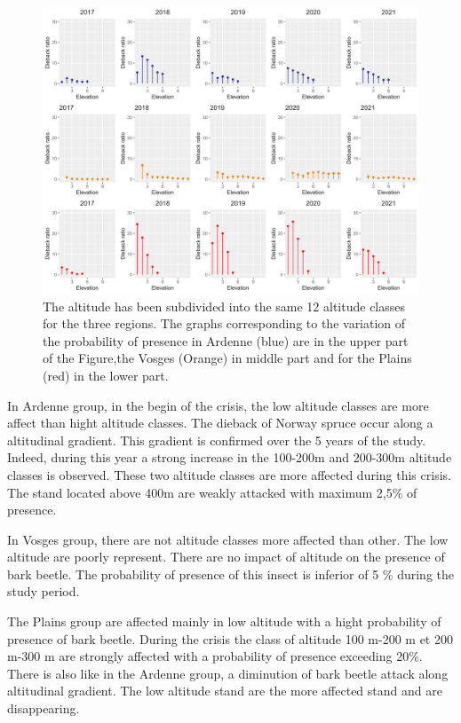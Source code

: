 \documentclass[3p,procedia]{elsarticle}
\begin{document}
\begin{figure}[htbp] 
\centering
	\includegraphics[width=\textwidth]{synthese_color_11_2022.png}
     \caption{The altitude has been subdivided into the same 12 altitude classes for the three regions. 
The graphs corresponding to the variation of the probability of presence in Ardenne (blue) are in the upper part of the Figure,the Vosges (Orange) in middle part and for the Plains (red) in the lower part.
}
	\label{alti_sco}
\end{figure}

In Ardenne group, in the begin of the crisis, the low altitude classes are more affect than hight altitude classes.
The dieback of Norway spruce occur along a altitudinal  gradient.
This gradient is confirmed over the 5 years of the study.
Indeed, during this year a strong increase in the 100-200m and 200-300m altitude classes is observed. 
These two altitude classes are more affected during this crisis.
The stand located above 400m are weakly attacked with maximum 2,5\% of presence.

In Vosges group, there are not altitude classes more affected than other. 
The low altitude are poorly represent. There are no impact of altitude on the presence of bark beetle. 
The probability of presence of this insect is inferior of 5 \% during the study period.

The Plains group are affected mainly in low altitude with a hight probability of presence of bark beetle. 
During the crisis the class of altitude 100 m-200 m et 200 m-300 m are strongly affected with a probability of presence exceeding 20\%.
There is also like in the Ardenne group, a diminution of bark beetle attack along altitudinal gradient.
The low altitude stand are the more affected stand and are disappearing.
\end{document}
